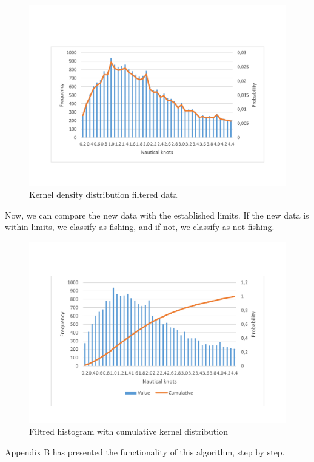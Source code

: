\begin{enumerate}
\end{enumerate} 

\begin{figure}[H]
\centering
\includegraphics[trim=0 50 0 50,width=0.8\linewidth]{Chapters/img/hist_kernel.pdf}
\caption{Kernel density distribution filtered data}
\label{fig:hist_kernel}
\end{figure}


Now, we can compare the new data with the established limits. If the new data is within limits, we classify as fishing, and if not, we classify as not fishing.

\begin{figure}[H]
\centering
\includegraphics[trim=0 50 0 50,width=0.8\linewidth]{Chapters/img/hist_comulative.pdf}
\caption{Filtred histogram with cumulative kernel distribution}
\label{fig:hist_comulative}
\end{figure}

Appendix B has presented the functionality of this algorithm, step by step. 



